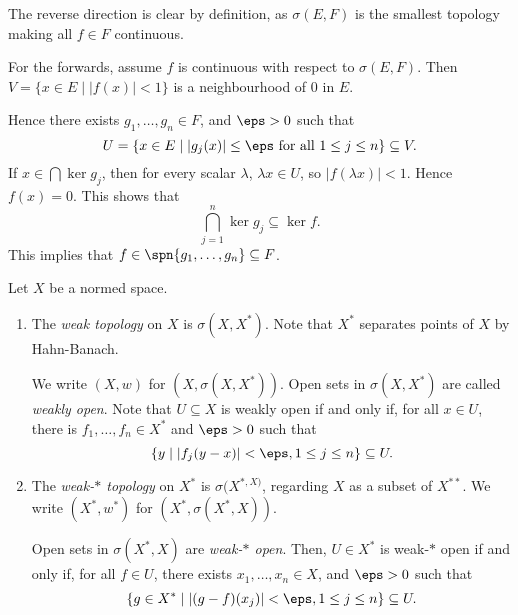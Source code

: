 \documentclass[12pt]{article}
\begin{document}
\begin{proofbox}
	The reverse direction is clear by definition, as $\sigma(E, F)$ is the smallest topology making all $f \in F$ continuous.

	For the forwards, assume $f$ is continuous with respect to $\sigma(E, F)$. Then $V = \{x \in E \mid |f(x)| < 1\}$ is a neighbourhood of $0$ in $E$.

	Hence there exists $g_1, \ldots, g_n \in F$, and $\eps > 0$ such that
	\[
		U = \{x \in E \mid |g_j(x)| \leq \eps \text{ for all } 1 \leq j \leq n\} \subseteq V.
	\]
	If $x \in \bigcap \ker g_j$, then for every scalar $\lambda$, $\lambda x \in U$, so $|f(\lambda x)| < 1$. Hence $f(x) = 0$. This shows that
	\[
	\bigcap_{j = 1}^n \ker  g_j \subseteq \ker f.
	\]
	This implies that $f \in \spn\{g_1, \ldots, g_n\} \subseteq F$.
\end{proofbox}

\begin{exbox}
	Let $X$ be a normed space.

	\begin{enumerate}
		\item The \emph{weak topology} on $X$ is $\sigma(X, X^{\ast})$. Note that $X^{\ast}$ separates points of $X$ by Hahn-Banach.

			We write $(X, w)$ for $(X, \sigma(X, X^{\ast}))$. Open sets in $\sigma(X, X^{\ast})$ are called \emph{weakly open}. Note that $U \subseteq X$ is weakly open if and only if, for all $x \in U$, there is $f_1, \ldots, f_n \in X^{\ast}$ and $\eps > 0$ such that
			\[
				\{y \mid |f_j(y- x)| < \eps, 1 \leq j \leq n\} \subseteq U.
			\]
		\item The \emph{weak-$\ast$ topology} on $X^{\ast}$ is $\sigma(X^{\ast, X)}$, regarding $X$ as a subset of $X^{\ast\ast}$. We write $(X^{\ast}, w^{\ast})$ for $(X^{\ast}, \sigma(X^{\ast}, X))$.

			Open sets in $\sigma(X^{\ast}, X)$ are \emph{weak-$\ast$ open}. Then, $U \in X^{\ast}$ is weak-$\ast$ open if and only if, for all $f \in U$, there exists $x_1, \ldots, x_n \in X$, and $\eps > 0$ such that
			\[
				\{ g \in X^{\ast} \mid |(g - f)(x_j)| < \eps, 1 \leq j \leq n\} \subseteq U.
			\]
	\end{enumerate}
\end{exbox}
\end{document}
